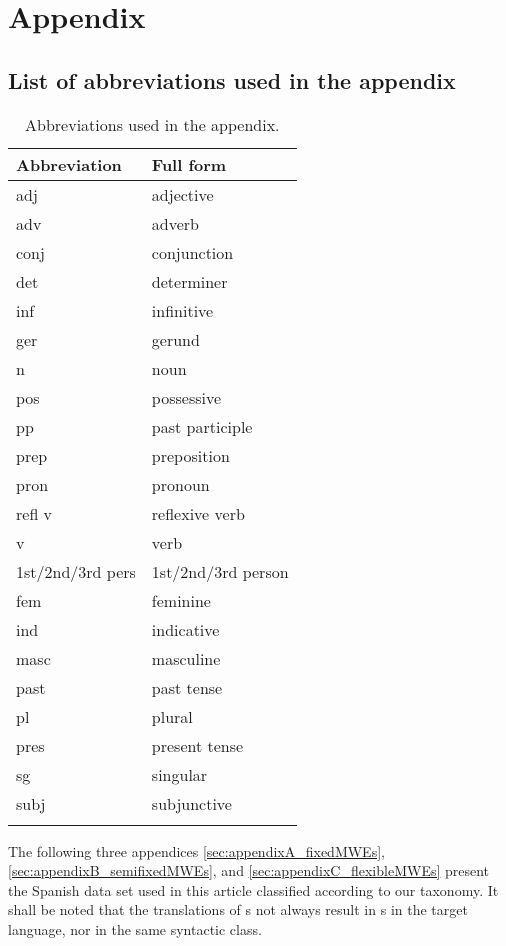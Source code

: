 \documentclass[output=paper]{langsci/langscibook}
\begin{document}
\newpage


\section{Appendix}

\subsection{List of abbreviations used in the appendix}
\label{sec:app-abbreviations}


\begin{table}[H]
\begin{tabular}{ll}
\lsptoprule
Abbreviation & Full form\\
\midrule
adj & adjective \\
adv & adverb \\
conj & conjunction \\
det & determiner \\
inf & infinitive \\
ger & gerund \\
n & noun \\
pos & possessive \\
pp & past participle \\
prep & preposition \\
pron & pronoun \\
refl v & reflexive verb \\
v & verb \\
\midrule
1st/2nd/3rd pers & 1st/2nd/3rd person \\
fem & feminine \\
ind & indicative \\
masc & masculine \\
past & past tense \\
pl & plural \\
pres & present tense \\
sg & singular \\
subj & subjunctive\\
\lspbottomrule
\end{tabular}
\caption{Abbreviations used in the appendix.}
\end{table}



\newpage

The following three appendices \ref{sec:appendixA_fixedMWEs}, \ref{sec:appendixB_semifixedMWEs}, and \ref{sec:appendixC_flexibleMWEs} present the Spanish data set used in this article classified according to our taxonomy.
It shall be noted that the translations of \mwe s not always result in \mwe s in the target language, nor in the same syntactic class.
\end{document}
